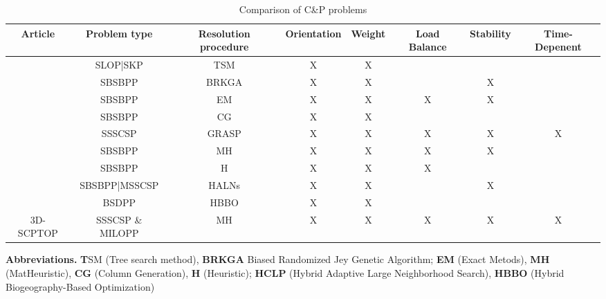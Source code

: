 \begin{table}
  \begin{adjustbox}{width=\textwidth}
    \begin{tabular}{|c|c|c|c|c|c|c|c|} \hline
      Article                           & Problem type     & Resolution procedure & Orientation & Weight & Load Balance & Stability & Time-Depenent \\
      \hline
      \autocite{Zhu2012AProblem}        & SLOP|SKP         & TSM                  & X           & X      &              &           &               \\ \hline
      \autocite{Goncalves2013AProblems} & SBSBPP           & BRKGA                & X           & X      &              & X         &               \\ \hline
      \autocite{2016Paquay}             & SBSBPP           & EM                   & X           & X      & X            & X         &               \\ \hline
      \autocite{Mahvash2018}            & SBSBPP           & CG                   & X           & X      &              &           &               \\ \hline \autocite{Alonso2020AConstraints}& SSSCSP& GRASP& X& X& X& X&X\\ \hline
      \autocite{Tresca2022}             & SBSBPP           & MH                   & X           & X      & X            & X         &               \\ \hline
      \autocite{Harrath2022}
                                        & SBSBPP           & H                    & X           & X      & X            &           &               \\ \hline
      \autocite{Li2022}                 & SBSBPP|MSSCSP    & HALNs                & X           & X      &              & X         &               \\
      \hline
      \autocite{Chen2023}               & BSDPP            & HBBO                 & X           & X      &              &           &               \\
      \hline
      3D-SCPTOP                         & SSSCSP \& MILOPP & MH                   & X           & X      & X            & X         & X             \\ \hline
    \end{tabular}
  \end{adjustbox}
  \begin{tablenotes}
    \scriptsize
    \item  \textbf{Abbreviations.}  \textbf{T}SM (Tree search method), \textbf{BRKGA} Biased Randomized Jey Genetic Algorithm; \textbf{EM} (Exact Metods), \textbf{MH} (MatHeuristic), \textbf{CG} (Column Generation), \textbf{H} (Heuristic); \textbf{HCLP} (Hybrid Adaptive Large Neighborhood Search), \textbf{HBBO} (Hybrid Biogeography-Based Optimization)
  \end{tablenotes}
  \label{tab:my_label}
  \caption{Comparison of C\&P problems}
\end{table}

